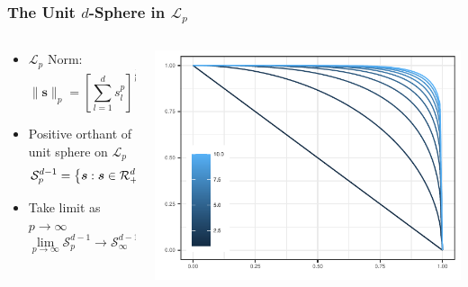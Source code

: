 \documentclass[aspectratio=169]{beamer}
\newlength{\frametextheight}
\begin{document}
\begin{frame}
  \frametitle{The Unit $d$-Sphere in $\mathcal{L}_p$}
  \begin{columns}
    \begin{column}{.49\textwidth}
      \begin{itemize}
        \item $\mathcal{L}_p$ Norm:
          \begin{equation*}
            \lVert \bm{s}\rVert_p = \left[{\scriptstyle\sum}_{l = 1}^ds_l^p\right]^{\frac{1}{p}}
          \end{equation*}
        \pause
        \item Positive orthant of unit sphere on $\mathcal{L}_p$
          \begin{equation*}
            \mathcal{S}_{p}^{d-1} = \left\lbrace \bm{s} : 
                \bm{s}\in\mathcal{R}_+^d,\hspace{.2cm} \lVert\bm{s}\rVert_p = 1 \right\rbrace
          \end{equation*}
        \item Take limit as $p\to\infty$
          \begin{equation*}
              \lim\limits_{p\to\infty}\mathcal{S}_p^{d-1} \rightarrow \mathcal{S}_{\infty}^{d-1}
          \end{equation*}
      \end{itemize}%
      \vfill
      ~
    \end{column}%
    \hfill%
    \begin{column}{.5\textwidth}
      \begin{center}
        \includegraphics[height=\frametextheight, width = \frametextheight]{./images/p_sphere}
      \end{center}
    \end{column}%
  \end{columns}%
\end{frame} %
\end{document}

